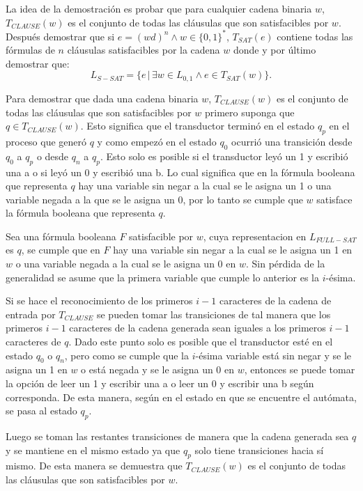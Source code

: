 \documentclass[12pt]{article}
\begin{document}
La idea de la demostración es probar que para cualquier cadena binaria $w$, $T_{CLAUSE}(w)$ es el conjunto de 
todas las cláusulas que son satisfacibles por $w$. Después demostrar que si $e=(wd)^n \wedge w\in\{0,1\}^*$, $T_{SAT}(e)$ contiene todas 
las fórmulas de $n$ cláusulas satisfacibles por la cadena $w$ donde  y por último demostrar que:
$$L_{S-SAT} = \{e\,|\,\exists w \in L_{0,1} \wedge e \in T_{SAT}(w) \}.$$

Para demostrar que dada una cadena binaria $w$, $T_{CLAUSE}(w)$ es el conjunto de todas las 
cláusulas que son satisfacibles por $w$ primero suponga que $q\in T_{CLAUSE}(w)$. 
Esto significa que el transductor terminó en el estado $q_p$ en el proceso que generó $q$ y como empezó 
en el estado $q_0$ ocurrió una transición desde $q_0$ a $q_p$ o desde $q_n$ a $q_p$. Esto solo es posible 
si el transductor leyó un 1 y escribió una a o si leyó un 0 y escribió una b. Lo cual significa que en la fórmula booleana que representa $q$
hay una variable sin negar a la cual se le asigna un 1 o una variable negada a la 
que se le asigna un 0, por lo tanto se cumple que $w$ satisface la fórmula booleana que representa $q$.

Sea una fórmula booleana $F$ satisfacible por $w$, cuya representacion en $L_{FULL-SAT}$ es $q$,  se cumple que 
en $F$ hay una variable sin negar a la cual se le asigna un 1 en $w$
o una variable negada a la cual se le asigna un 0 en $w$. Sin pérdida de la generalidad se asume que la primera variable que cumple lo anterior es la $i$-ésima.  

Si se hace el reconocimiento de los primeros $i-1$ caracteres de la cadena de entrada por $T_{CLAUSE}$ se pueden
tomar las transiciones de tal manera que los primeros $i-1$ caracteres de la cadena generada sean iguales a los primeros $i-1$ caracteres de $q$. 
Dado este punto solo es posible que el transductor esté en el estado $q_0$ o $q_n$, pero como se cumple que la 
$i$-ésima variable está sin negar y se le asigna un 1 en $w$ o está negada y se le asigna un 0 en $w$, entonces se puede 
tomar la opción de leer un 1 y escribir una a o leer un 0 y escribir una b según corresponda. 
De esta manera, según en el estado en que se encuentre el autómata, se pasa al estado $q_p$.

Luego se toman las restantes transiciones de manera que la cadena generada sea $q$ y se mantiene en el mismo 
estado ya que $q_p$ solo tiene transiciones hacia sí mismo. De esta manera se demuestra que $T_{CLAUSE}(w)$
es el conjunto de todas las cláusulas que son satisfacibles por $w$.
\end{document}
